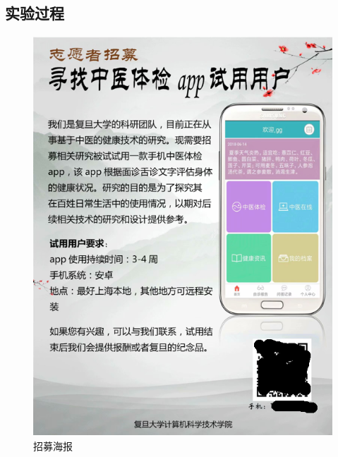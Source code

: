 \subsection{实验过程}
\begin{figure}[h]
    \centering
    \includegraphics[height=15cm]{images/poster.png}
    \caption{招募海报}
    \label{fig:poster}
\end{figure}


